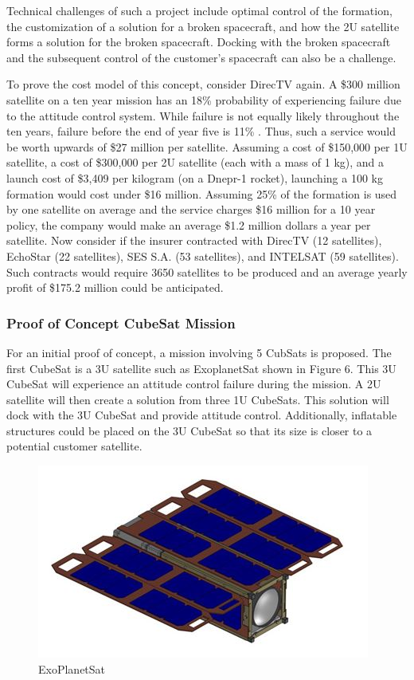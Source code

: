 Technical challenges of such a project include optimal control of the formation, the customization of a solution for a broken spacecraft, and how the 2U satellite forms a solution for the broken spacecraft. Docking with the broken spacecraft and the subsequent control of the customer's spacecraft can also be a challenge.

To prove the cost model of this concept, consider DirecTV again. A \$300 million satellite on a ten year mission has an 18\% probability of experiencing failure due to the attitude control system. While failure is not equally likely throughout the ten years, failure before the end of year five is 11\% \cite{SMAD}. Thus, such a service would be worth upwards of \$27 million per satellite. Assuming a cost of \$150,000 per 1U satellite, a cost of \$300,000 per 2U satellite (each with a mass of 1 kg), and a launch cost of \$3,409 per kilogram (on a Dnepr-1 rocket), launching a 100 kg formation would cost under \$16 million. Assuming 25\% of the formation is used by one satellite on average and the service charges \$16 million for a 10 year policy, the company would make an average \$1.2 million dollars a year per satellite. Now consider if the insurer contracted with DirecTV (12 satellites), EchoStar (22 satellites), SES S.A. (53 satellites), and INTELSAT (59 satellites). Such contracts would require 3650 satellites to be produced and an average yearly profit of \$175.2 million could be anticipated. 

\subsubsection{Proof of Concept CubeSat Mission}
For an initial proof of concept, a mission involving 5 CubSats is proposed. The first CubeSat is a 3U satellite such as ExoplanetSat shown in Figure 6. This 3U CubeSat will experience an attitude control failure during the mission. A 2U satellite will then create a solution from three 1U CubeSats. This solution will dock with the 3U CubeSat and provide attitude control. Additionally, inflatable structures could be placed on the 3U CubeSat so that its size is closer to a potential customer satellite.

\begin{figure}[!h]
\centering
\includegraphics[scale=0.75]{ExoPlanetSat.jpg}
\caption{ExoPlanetSat \cite{MIT}}
\end{figure}


